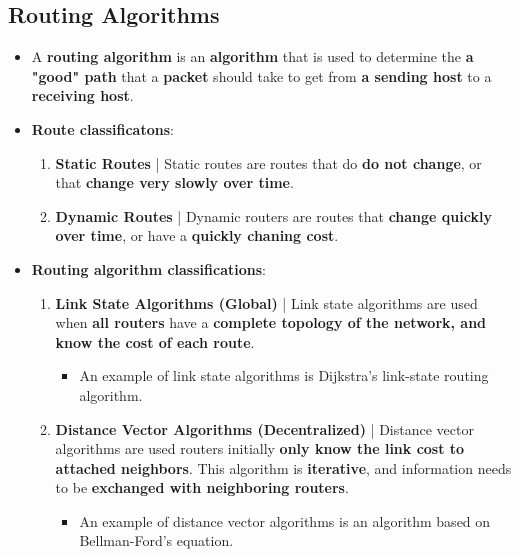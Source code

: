 \documentclass{article}
\begin{document}
    \subsection*{Routing Algorithms}
    \begin{itemize}
        \item A \textbf{routing algorithm} is an \textbf{algorithm} that is used to determine the \textbf{a "good" path} that a \textbf{packet} should take to get from \textbf{a sending host} to a \textbf{receiving host}.
        \item \textbf{Route classificatons}:
        \begin{enumerate}
            \item \textbf{Static Routes} | Static routes are routes that do \textbf{do not change}, or that \textbf{change very slowly over time}.
            \item \textbf{Dynamic Routes} | Dynamic routers are routes that \textbf{change quickly over time}, or have a \textbf{quickly chaning cost}.
        \end{enumerate}
        \item \textbf{Routing algorithm classifications}:
        \begin{enumerate}
            \item \textbf{Link State Algorithms (Global)} | Link state algorithms are used when \textbf{all routers} have a \textbf{complete topology of the network, and know the cost of each route}.
            \begin{itemize}
                \item An example of link state algorithms is Dijkstra's link-state routing algorithm.
            \end{itemize}
            \item \textbf{Distance Vector Algorithms (Decentralized)} | Distance vector algorithms are used routers initially \textbf{only know the link cost to attached neighbors}. This algorithm is \textbf{iterative}, and information needs to be \textbf{exchanged with neighboring routers}.
            \begin{itemize}
                \item An example of distance vector algorithms is an algorithm based on Bellman-Ford's equation.
            \end{itemize}
        \end{enumerate}
    \end{itemize}
\end{document}
